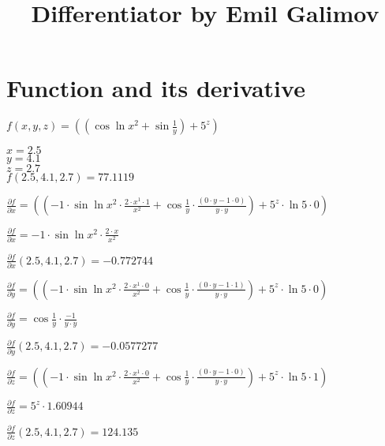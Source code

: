 \documentclass{article}
\title{Differentiator by Emil Galimov}
\begin{document}
\maketitle
\section{Function and its derivative}
\begin{center}
$f( x, y, z) = (( \cos{ \ln{x^{2}}}+ \sin{\frac{1}{y}})+5^{z})$\\
\end{center}
\begin{center}
$x = 2.5$\\ 
$y = 4.1$\\ 
$z = 2.7$\\ 
$f( 2.5, 4.1, 2.7) = 77.1119$
\end{center}
\begin{center}
$\frac{\partial f}{\partial x} = ((-1 \cdot  \sin{ \ln{x^{2}}} \cdot \frac{2 \cdot x^{1} \cdot 1}{x^{2}}+ \cos{\frac{1}{y}} \cdot \frac{(0 \cdot y-1 \cdot 0)}{y \cdot y})+5^{z} \cdot  \ln{5} \cdot 0)$\\
\end{center}
\begin{center}
$\frac{\partial f}{\partial x} = -1 \cdot  \sin{ \ln{x^{2}}} \cdot \frac{2 \cdot x}{x^{2}}$\\
\end{center}
\begin{center}
$\frac{\partial f}{\partial x}(2.5, 4.1, 2.7) = -0.772744$\\
\end{center}
\begin{center}
$\frac{\partial f}{\partial y} = ((-1 \cdot  \sin{ \ln{x^{2}}} \cdot \frac{2 \cdot x^{1} \cdot 0}{x^{2}}+ \cos{\frac{1}{y}} \cdot \frac{(0 \cdot y-1 \cdot 1)}{y \cdot y})+5^{z} \cdot  \ln{5} \cdot 0)$\\
\end{center}
\begin{center}
$\frac{\partial f}{\partial y} =  \cos{\frac{1}{y}} \cdot \frac{-1}{y \cdot y}$\\
\end{center}
\begin{center}
$\frac{\partial f}{\partial y}(2.5, 4.1, 2.7) = -0.0577277$\\
\end{center}
\begin{center}
$\frac{\partial f}{\partial z} = ((-1 \cdot  \sin{ \ln{x^{2}}} \cdot \frac{2 \cdot x^{1} \cdot 0}{x^{2}}+ \cos{\frac{1}{y}} \cdot \frac{(0 \cdot y-1 \cdot 0)}{y \cdot y})+5^{z} \cdot  \ln{5} \cdot 1)$\\
\end{center}
\begin{center}
$\frac{\partial f}{\partial z} = 5^{z} \cdot 1.60944$\\
\end{center}
\begin{center}
$\frac{\partial f}{\partial z}(2.5, 4.1, 2.7) = 124.135$\\
\end{center}
\end{document}
